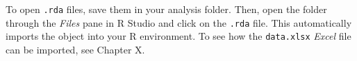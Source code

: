 To open \texttt{.rda} files, save them in your analysis folder. Then, open the folder through the \emph{Files} pane in R Studio and click on the \texttt{.rda} file. This automatically imports the object into your \textsf{R} environment. To see how the \texttt{data.xlsx} \emph{Excel} file can be imported, see Chapter X.


\newpage





\printindex